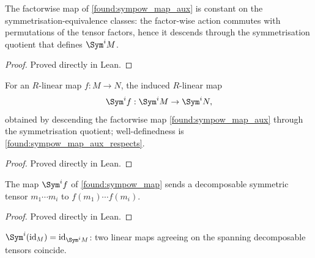 \begin{lemma}
  \label{found:sympow_map_aux_respects}
  The factorwise map of \cref{found:sympow_map_aux} is constant on the
  symmetrisation-equivalence classes: the factor-wise action commutes with
  permutations of the tensor factors, hence it descends through the
  symmetrisation quotient that defines \(\Sym^i M\).
\end{lemma}

\begin{proof}

\leanok
  Proved directly in Lean.
\end{proof}

\begin{lemma}
  \label{found:sympow_map}
  For an \(R\)-linear map \(f:M\to N\), the induced \(R\)-linear map
  \[
    \Sym^i f:\Sym^i M\to\Sym^i N ,
  \]
  obtained by descending the factorwise map \cref{found:sympow_map_aux} through
  the symmetrisation quotient; well-definedness is
  \cref{found:sympow_map_aux_respects}.
\end{lemma}

\begin{proof}

\leanok
  Proved directly in Lean.
\end{proof}

\begin{lemma}
  \label{found:sympow_map_tprod}
  The map \(\Sym^i f\) of \cref{found:sympow_map} sends a decomposable symmetric
  tensor \(m_1\cdots m_i\) to \(f(m_1)\cdots f(m_i)\).
\end{lemma}

\begin{proof}

\leanok
  Proved directly in Lean.
\end{proof}

\begin{lemma}
  \label{found:sympow_map_id}
  \(\Sym^i(\mathrm{id}_M)=\mathrm{id}_{\Sym^i M}\): two linear maps agreeing on
  the spanning decomposable tensors coincide.
\end{lemma}

